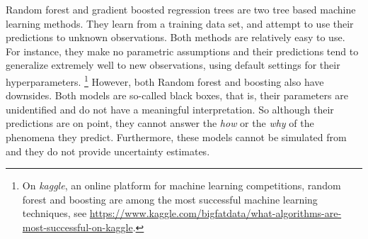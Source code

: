 \documentclass[a4paper,usenames,dvipsnames]{article}
\newenvironment{revision}{\color{teal}}{\color{black}}
\begin{document}
\begin{revision}
Random forest \cite{breiman2001random} and gradient boosted regression trees \cite{Friedman2001greedy} are two tree based machine learning methods.
They learn from a training data set, and attempt to use their predictions to unknown observations.
Both methods are relatively easy to use.
For instance, they make no parametric assumptions and their predictions tend to generalize extremely well to new observations, using default settings for their hyperparameters.%
\footnote{\begin{revision}On \emph{kaggle}, an online platform for machine learning competitions, random forest and boosting are among the most successful machine learning techniques, see \url{https://www.kaggle.com/bigfatdata/what-algorithms-are-most-successful-on-kaggle}.\end{revision}}
However, both Random forest and boosting also have downsides.
Both models are so-called black boxes, that is, their parameters are unidentified and do not have a meaningful interpretation. So although their predictions are on point, they cannot answer the \emph{how} or the \emph{why} of the phenomena they predict. Furthermore, these models cannot be simulated from and they do not provide uncertainty estimates.%
\end{revision}
\end{document}
